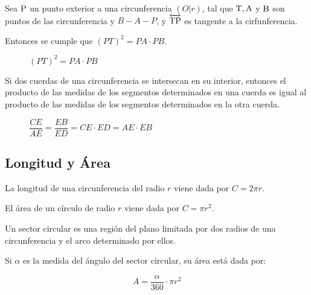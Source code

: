 \clearpage

\begin{theorem}

    Sea $\rm P$ un punto exterior a una circunferencia $(O|r)$, tal que $\rm T,A$ y $\rm B$ son puntos de las circunferencia y $B-A-P$, y $\overleftrightarrow{\rm TP}$ es tangente a la cirfunferencia.

    Entonces se cumple que $(PT)^2 = PA \cdot PB$.

    \begin{figure}[!h]
        \centering
        
        \caption{$(PT)^2 = PA \cdot PB$}
        \label{fig:theorem39}
    \end{figure}

\end{theorem}


\begin{theorem}

Si dos cuerdas de una circunferencia se intersecan en su interior, entonces el producto de las medidas de los segmentos determinados en una cuerda es igual al producto de las medidas de los segmentos determinados en la otra cuerda.

    \begin{figure}[!h]
        \centering
        
        \caption{$\dfrac{CE}{AE}=\dfrac{EB}{ED} = CE \cdot ED = AE \cdot EB$}
        \label{fig:theorem40}
    \end{figure}
    
\end{theorem}

\clearpage

\subsection{Longitud y Área}

\begin{theorem}
    La longitud de una circunferencia del radio $r$ viene dada por $C=2\pi r$.
\end{theorem}

\begin{theorem}
    El área de un círculo de radio $r$ viene dada por $C=\pi r^2$.
\end{theorem}

\begin{definition}
    Un sector circular es una región del plano limitada por dos radios de una circunferencia y el arco determinado por ellos.

    Si $\alpha$ es la medida del ángulo del sector circular, su área está dada por:

    $$A = \dfrac{\alpha}{360} \cdot \pi r^2$$
    
\end{definition}

